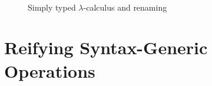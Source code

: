 \documentclass[sigplan,review,fleqn]{acmart}
\begin{document}
\begin{figure}
\begin{code}
	\AgdaSymbol{)}\AgdaSpace{}%
	\<%
	\\
	\\[\AgdaEmptyExtraSkip]%
	\>[0]%
	\>[307I]\AgdaSymbol{:}\AgdaSpace{}%
	\AgdaSpace{}%
	\AgdaSymbol{\{}\AgdaSymbol{\}}\AgdaSpace{}%
	\AgdaSpace{}%
	\AgdaSpace{}%
	\AgdaSpace{}%
	\AgdaSpace{}%
	\AgdaSpace{}%
	\AgdaSpace{}%
	\AgdaSpace{}%
	\AgdaSymbol{)}\<%
	\\
	\>[.][@{}l@{}]\<[307I]%
	\>[7]\AgdaSpace{}%
	\AgdaSpace{}%
	\AgdaSpace{}%
	\AgdaSpace{}%
	\AgdaSpace{}%
	\AgdaSpace{}%
	\AgdaSpace{}%
	\<%
	\\
	\>[0]\AgdaSpace{}%
	\AgdaSpace{}%
	\AgdaSymbol{(}\AgdaSpace{}%
	\AgdaSymbol{)}%
	\>[20]\AgdaSymbol{=}\AgdaSpace{}%
	\AgdaSpace{}%
	\AgdaSymbol{(}\AgdaSpace{}%
	\AgdaSymbol{)}\<%
	\\
	\>[0]\AgdaSpace{}%
	\AgdaSpace{}%
	\AgdaSymbol{(}\AgdaSpace{}%
	\AgdaSpace{}%
	\AgdaSymbol{)}\AgdaSpace{}%
	\>[20]\AgdaSymbol{=}\AgdaSpace{}%
	\AgdaSpace{}%
	\AgdaSymbol{(}\AgdaSpace{}%
	\AgdaSpace{}%
	\AgdaSymbol{)}\AgdaSpace{}%
	\AgdaSymbol{(}\AgdaSpace{}%
	\AgdaSpace{}%
	\AgdaSymbol{)}\<%
	\\
	\>[0]\AgdaSpace{}%
	\AgdaSpace{}%
	\AgdaSymbol{(}\AgdaSpace{}%
	\AgdaSymbol{)}%
	\>[20]\AgdaSymbol{=}\AgdaSpace{}%
	\AgdaSpace{}%
	\AgdaSymbol{(}\AgdaSpace{}%
	\AgdaSymbol{(}\AgdaSpace{}%
	\AgdaSymbol{)}\AgdaSpace{}%
	\AgdaSymbol{)}\<%
\end{code}
\caption{Simply typed $\lambda$-calculus and renaming}
\label{fig:native-renaming}
\end{figure}

\section{Reifying Syntax-Generic Operations}
\label{sec:demo}
\end{document}
